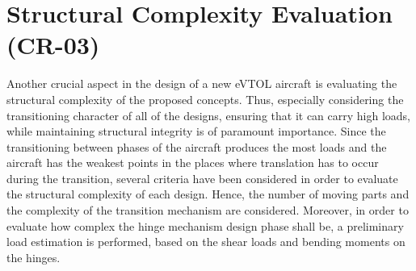 


\section{Structural Complexity Evaluation (CR-03)}
Another crucial aspect in the design of a new eVTOL aircraft is evaluating the structural complexity of the proposed concepts.
Thus, especially considering the transitioning character of all of the designs, ensuring that it can carry high loads, while maintaining structural integrity is of paramount importance.
Since the transitioning between phases of the aircraft produces the most loads and the aircraft has the weakest points in the places where translation has to occur during the transition, several criteria have been considered in order to evaluate the structural complexity of each design.
Hence, the number of moving parts and the complexity of the transition mechanism are considered.
Moreover, in order to evaluate how complex the hinge mechanism design phase shall be, a preliminary load estimation is performed, based on the shear loads and bending moments on the hinges.

